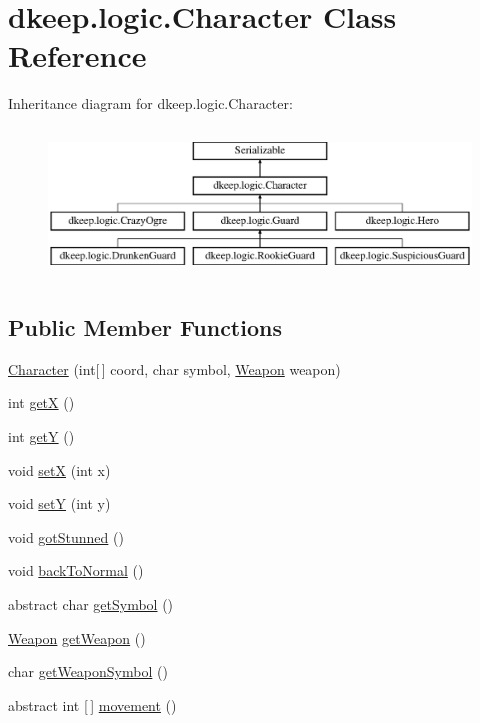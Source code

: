 \hypertarget{classdkeep_1_1logic_1_1_character}{}\section{dkeep.\+logic.\+Character Class Reference}
\label{classdkeep_1_1logic_1_1_character}
Inheritance diagram for dkeep.\+logic.\+Character\+:\begin{figure}[H]
\begin{center}
\leavevmode
\includegraphics[height=4.000000cm]{classdkeep_1_1logic_1_1_character}
\end{center}
\end{figure}
\subsection*{Public Member Functions}
\begin{DoxyCompactItemize}
\item 
\hyperlink{classdkeep_1_1logic_1_1_character_aae3bf0eb8507fa97aef9e6ece534ea58}{Character} (int\mbox{[}$\,$\mbox{]} coord, char symbol, \hyperlink{classdkeep_1_1logic_1_1_weapon}{Weapon} weapon)
\item 
int \hyperlink{classdkeep_1_1logic_1_1_character_aa8f5ac737dad552c4cffeeaffd2194ec}{getX} ()
\item 
int \hyperlink{classdkeep_1_1logic_1_1_character_a6d872834994ec8c4bea59d1803f3be59}{getY} ()
\item 
void \hyperlink{classdkeep_1_1logic_1_1_character_a5e41fc20fed934fc02bf114f603e540b}{setX} (int x)
\item 
void \hyperlink{classdkeep_1_1logic_1_1_character_aef6651cd827a83c4518e4dcba4ead2b4}{setY} (int y)
\item 
void \hyperlink{classdkeep_1_1logic_1_1_character_a39b7935ecc4b2be1e3070c292d1356bf}{got\+Stunned} ()
\item 
void \hyperlink{classdkeep_1_1logic_1_1_character_afe41039ed701e55162455dd8d480fe2b}{back\+To\+Normal} ()
\item 
abstract char \hyperlink{classdkeep_1_1logic_1_1_character_a8cb0733b49fdd569cc58fe5a3b1a9c29}{get\+Symbol} ()
\item 
\hyperlink{classdkeep_1_1logic_1_1_weapon}{Weapon} \hyperlink{classdkeep_1_1logic_1_1_character_a19d825a86884f725aedd76fdd49ff964}{get\+Weapon} ()
\item 
char \hyperlink{classdkeep_1_1logic_1_1_character_a22be2db9df156acfb3638b3d8826f5ea}{get\+Weapon\+Symbol} ()
\item 
abstract int \mbox{[}$\,$\mbox{]} \hyperlink{classdkeep_1_1logic_1_1_character_a400aadf032a66c591f4ad6ca2660f3f2}{movement} ()
\end{DoxyCompactItemize}
